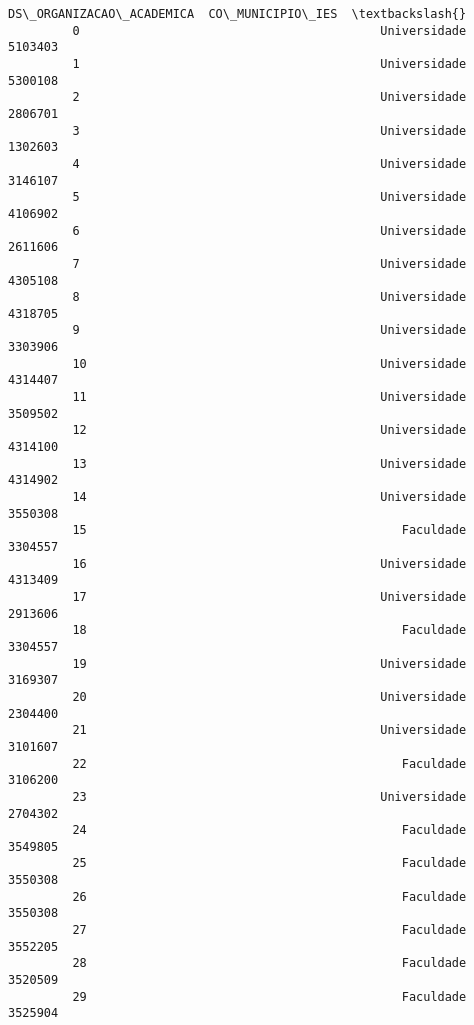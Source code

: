 \documentclass[11pt]{article}
\begin{document}
\begin{Verbatim}[commandchars=\\\{\}]
                                        DS\_ORGANIZACAO\_ACADEMICA  CO\_MUNICIPIO\_IES  \textbackslash{}
         0                                          Universidade           5103403   
         1                                          Universidade           5300108   
         2                                          Universidade           2806701   
         3                                          Universidade           1302603   
         4                                          Universidade           3146107   
         5                                          Universidade           4106902   
         6                                          Universidade           2611606   
         7                                          Universidade           4305108   
         8                                          Universidade           4318705   
         9                                          Universidade           3303906   
         10                                         Universidade           4314407   
         11                                         Universidade           3509502   
         12                                         Universidade           4314100   
         13                                         Universidade           4314902   
         14                                         Universidade           3550308   
         15                                            Faculdade           3304557   
         16                                         Universidade           4313409   
         17                                         Universidade           2913606   
         18                                            Faculdade           3304557   
         19                                         Universidade           3169307   
         20                                         Universidade           2304400   
         21                                         Universidade           3101607   
         22                                            Faculdade           3106200   
         23                                         Universidade           2704302   
         24                                            Faculdade           3549805   
         25                                            Faculdade           3550308   
         26                                            Faculdade           3550308   
         27                                            Faculdade           3552205   
         28                                            Faculdade           3520509   
         29                                            Faculdade           3525904   

\end{Verbatim}
\end{document}
